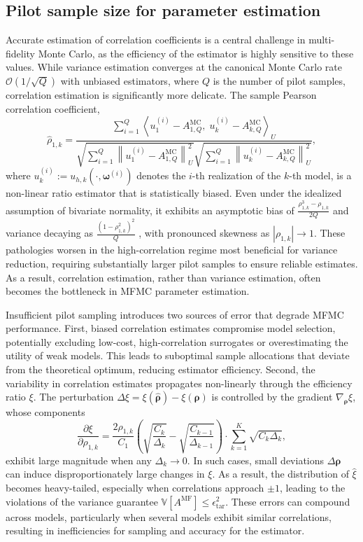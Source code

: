 \subsection{Pilot sample size for parameter estimation}\label{sec:Parameter_Estimation}

Accurate estimation of correlation coefficients is a central challenge in multi-fidelity Monte Carlo, as the efficiency of the estimator is highly sensitive to these values. While variance estimation converges at the canonical Monte Carlo rate $\mathcal{O}(1/\sqrt{Q})$ with unbiased estimators, where $Q$ is the number of pilot samples, correlation estimation is significantly more delicate. The sample Pearson correlation coefficient,
%
\[
\widehat{\rho}_{1,k} = \frac{\sum_{i=1}^Q\left\langle u_{1}^{(i)} - A_{1,Q}^{\text{MC}},\; u_{k}^{(i)} - A_{k,Q}^{\text{MC}} \right\rangle_U}{\sqrt{\sum_{i=1}^Q \left\|u_{1}^{(i)} - A_{1,Q}^{\text{MC}}\right\|_U^2} \sqrt{\sum_{i=1}^Q \left\|u_{k}^{(i)} - A_{k,Q}^{\text{MC}}\right\|_U^2}},
\]
%
where $u_k^{(i)} := u_{h,k}(\cdot, \boldsymbol{\omega}^{(i)})$ denotes the $i$-th realization of the $k$-th model, is a non-linear ratio estimator that is statistically biased. Even under the idealized assumption of bivariate normality, it exhibits an asymptotic bias of $\frac{\rho_{1,k}^3 - \rho_{1,k}}{2Q}$ and variance decaying as $\frac{(1 - \rho_{1,k}^2)^2}{Q}$ \cite{Fi:1915, Ha:2007, Ri:1932}, with pronounced skewness as $|\rho_{1,k}| \to 1$. These pathologies worsen in the high-correlation regime most beneficial for variance reduction, requiring substantially larger pilot samples to ensure reliable estimates. As a result, correlation estimation, rather than variance estimation, often becomes the bottleneck in MFMC parameter estimation.




Insufficient pilot sampling introduces two sources of error that degrade MFMC performance. First, biased correlation estimates compromise model selection, potentially excluding low-cost, high-correlation surrogates or overestimating the utility of weak models. This leads to suboptimal sample allocations that deviate from the theoretical optimum, reducing estimator efficiency. Second, the variability in correlation estimates propagates non-linearly through the efficiency ratio $\xi$. The perturbation $\Delta\xi = \xi(\widehat{\boldsymbol{\rho}}) - \xi(\boldsymbol{\rho})$ is controlled by the gradient $\nabla_{\boldsymbol{\rho}} \xi$, whose components
%
\[
\frac{\partial \xi}{\partial \rho_{1,k}} = \frac{2\rho_{1,k}}{C_1}\left(\sqrt{\frac{C_k}{\Delta_k }} - \sqrt{\frac{C_{k-1}}{\Delta_{k-1} }}\right)\cdot \sum_{k=1}^K\sqrt{C_k\Delta_k },
\]
%
exhibit large magnitude when any $\Delta_k \to 0$. In such cases, small deviations $\Delta \boldsymbol{\rho}$ can induce disproportionately large changes in $\xi$. As a result, the distribution of $\widehat{\xi}$ becomes heavy-tailed, especially when correlations approach $\pm 1$, leading to the violations of the variance guarantee $\mathbb{V}[A^{\mathrm{MF}}] \leq \epsilon_{\mathrm{tar}}^2$. These errors can compound across models, particularly when several models exhibit similar correlations, resulting in inefficiencies for sampling and accuracy for the estimator.




